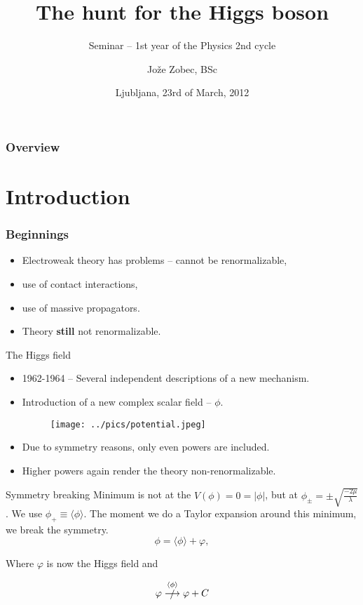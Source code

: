 \documentclass{beamer}
\title{The hunt for the Higgs boson}
\subtitle{Seminar -- 1st year of the Physics 2nd cycle}
\author{Jože Zobec, BSc}
\date[23. 5. 2012]{Ljubljana, 23rd of March, 2012}
\institute[UL, FMF]{Supervisor: Marko Mikuž, PhD}
\newcommand{\vac}{
	\ensuremath{\langle\phi\rangle}
}
\begin{document}
\begin{frame}
	\titlepage
\end{frame}

\begin{frame}
	\frametitle{Overview}
	\tableofcontents
\end{frame}

\section{Introduction}
\begin{frame}
	\frametitle{Beginnings}
	\begin{itemize}
		\item{Electroweak theory has problems -- cannot be renormalizable,}
		\item{use of contact interactions,}
		\item{use of massive propagators.}
		\item{Theory {\bf still} not renormalizable.}
	\end{itemize}
\end{frame}

\begin{frame}{The Higgs field}
	  \begin{itemize}
	   \item{1962-1964 -- Several independent descriptions of a new mechanism.}
	   \item{Introduction of a new complex scalar field -- $\phi$.
		\begin{figure}[H]
			\texttt{[image: ../pics/potential.jpeg]}
		\end{figure}
		}
	   \item{Due to symmetry reasons, only even powers are included.}
	   \item{Higher powers again render the theory non-renormalizable.}
	  \end{itemize}
\end{frame}

\begin{frame}{Symmetry breaking}
	Minimum is not at the $V(\phi) = 0 = |\phi|$, but at $\phi_{\pm} = \pm \sqrt{\frac{-2\mu}{\lambda}}$.
	We use $\phi_+ \equiv \vac$. The moment we do a Taylor expansion around this minimum, we break the
	symmetry.
\[
	\phi = \vac + \varphi,
\]

Where $\varphi$ is now the Higgs field and

\[
	\varphi \stackrel{\vac}{\slashed{\longrightarrow}} \varphi + C
\]

\end{frame}
\end{document}
